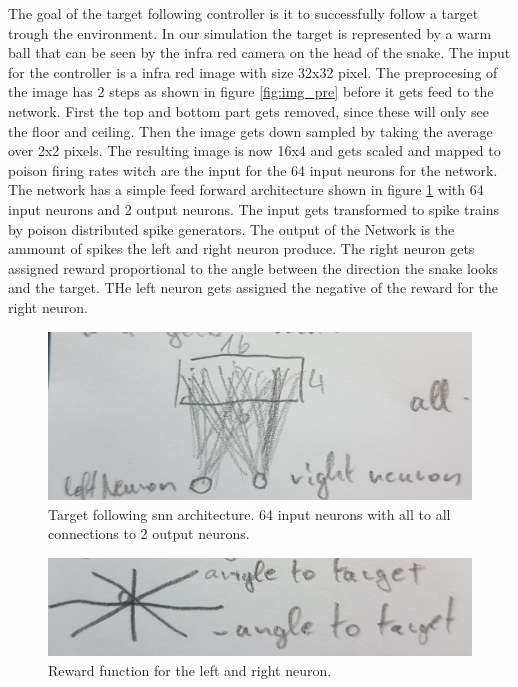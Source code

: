 The goal of the target following controller is it to successfully follow a target trough the environment. In our simulation the target is represented by a warm ball that can be seen by the infra red camera on the head of the snake. The input for the controller is a infra red image with size 32x32 pixel. The preprocesing of the image has 2 steps as shown in figure \ref{fig:img_pre} before it gets feed to the network. First the top and bottom part gets removed, since these will only see the floor and ceiling. Then the image gets down sampled by taking the average over 2x2 pixels. The resulting image is now 16x4 and gets scaled and mapped to poison firing rates witch are the input for the 64 input neurons for the network. The network has a  simple feed forward architecture shown in figure \ref{fig:follw_arch} with 64 input neurons and 2 output neurons. The input gets transformed to spike trains by poison distributed spike generators. The output of the Network is the ammount of spikes the left and right neuron produce. The right neuron gets assigned reward proportional to the angle between the direction the snake looks and the target. THe left neuron gets assigned the negative of the reward for the right neuron.

\begin{figure}
	\includegraphics[width=\linewidth]{images/follow_arch.jpg}
	\caption{Target following snn architecture. 64 input neurons with all to all connections to 2 output neurons.}
	\label{fig:follw_arch}
\end{figure}

\begin{figure}
	\includegraphics[width=\linewidth]{images/follow_rew.jpg}
	\caption{Reward function for the left and right neuron.}
	\label{fig:follw_rew}
\end{figure}

